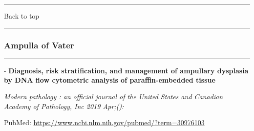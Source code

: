 \documentclass[]{article}
\begin{document}
{}

{}

\begin{center}\rule{0.5\linewidth}{\linethickness}\end{center}

Back to top

\begin{center}\rule{0.5\linewidth}{\linethickness}\end{center}

\pagebreak

\hypertarget{ampulla-of-vater-1}{%
\subsubsection{Ampulla of Vater}\label{ampulla-of-vater-1}}

\begin{center}\rule{0.5\linewidth}{\linethickness}\end{center}

 - \textbf{Diagnosis, risk stratification, and management of ampullary
dysplasia by DNA flow cytometric analysis of paraffin-embedded tissue}

\emph{Modern pathology : an official journal of the United States and
Canadian Academy of Pathology, Inc 2019 Apr;():}

PubMed: \url{https://www.ncbi.nlm.nih.gov/pubmed/?term=30976103}
\end{document}

